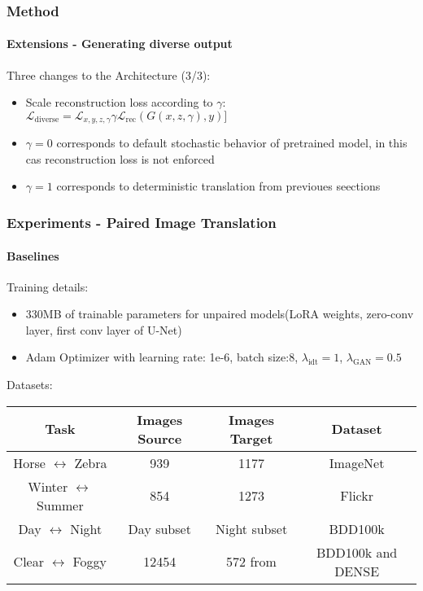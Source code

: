 \documentclass[aspectratio=169, lecture, amberg]{OTHAWbeamer}
\begin{document}
\begin{frame}
    \frametitle{Method}
    \framesubtitle{Extensions - Generating diverse output}
    Three changes to the Architecture (3/3):
    \begin {itemize}
        \item Scale reconstruction loss according to $\gamma$: $\mathcal{L}_{\text{diverse}} = \mathcal{L}_{x,y,z,\gamma} \gamma\mathcal{L}_{\text{rec}}(G(x,z,\gamma),y)]$
        \item $\gamma = 0$ corresponds to default stochastic behavior of pretrained model, in this cas reconstruction loss is not enforced
        \item $\gamma = 1$ corresponds to deterministic translation from previoues seections
    \end{itemize}
\end{frame}

\begin{frame}
\frametitle{Experiments - Paired Image Translation}
\framesubtitle{Baselines}
Training details:
\begin{itemize}
    \item 330MB of trainable parameters for unpaired models(LoRA weights, zero-conv layer, first conv layer of U-Net)
    \item Adam Optimizer with learning rate: 1e-6, batch size:8, $\lambda _{\text{idt}} = 1$, $\lambda _{\text{GAN}} = 0.5$
\end{itemize}
Datasets:
\begin{table}
    \centering
    \begin{tabular}{|c|c|c|c|}
        Task & Images Source & Images Target & Dataset \\
        \hline
        Horse $\leftrightarrow$ Zebra & 939 & 1177 & ImageNet \cite{5206848}\\
        Winter $\leftrightarrow$ Summer & 854 & 1273 & Flickr \cite{zhu2020unpaired} \\
        Day $\leftrightarrow$ Night & Day subset & Night subset & BDD100k \cite{yu2020bdd100k}\\
        Clear $\leftrightarrow$ Foggy & 12454 & 572 from & BDD100k and DENSE \cite{bijelic2020seeing}
    \end{tabular}       
\end{table}
\end{frame}
\end{document}

